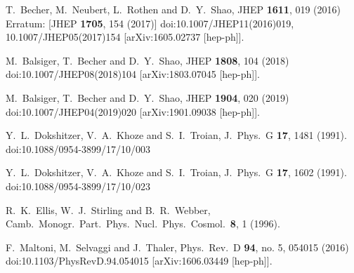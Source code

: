 \documentclass[11pt,a4paper]{article}
\begin{document}
\begin{thebibliography}{99}
  T.~Becher, M.~Neubert, L.~Rothen and D.~Y.~Shao,
  JHEP {\bf 1611}, 019 (2016)
  Erratum: [JHEP {\bf 1705}, 154 (2017)]
  doi:10.1007/JHEP11(2016)019, 10.1007/JHEP05(2017)154
  [arXiv:1605.02737 [hep-ph]].


  M.~Balsiger, T.~Becher and D.~Y.~Shao,
  JHEP {\bf 1808}, 104 (2018)
  doi:10.1007/JHEP08(2018)104
  [arXiv:1803.07045 [hep-ph]].


  M.~Balsiger, T.~Becher and D.~Y.~Shao,
  JHEP {\bf 1904}, 020 (2019)
  doi:10.1007/JHEP04(2019)020
  [arXiv:1901.09038 [hep-ph]].


  Y.~L.~Dokshitzer, V.~A.~Khoze and S.~I.~Troian,
  J.\ Phys.\ G {\bf 17}, 1481 (1991).
  doi:10.1088/0954-3899/17/10/003


  Y.~L.~Dokshitzer, V.~A.~Khoze and S.~I.~Troian,
  J.\ Phys.\ G {\bf 17}, 1602 (1991).
  doi:10.1088/0954-3899/17/10/023


  R.~K.~Ellis, W.~J.~Stirling and B.~R.~Webber,
  Camb.\ Monogr.\ Part.\ Phys.\ Nucl.\ Phys.\ Cosmol.\  {\bf 8}, 1 (1996).


  F.~Maltoni, M.~Selvaggi and J.~Thaler,
  Phys.\ Rev.\ D {\bf 94}, no. 5, 054015 (2016)
  doi:10.1103/PhysRevD.94.054015
  [arXiv:1606.03449 [hep-ph]].



\end{thebibliography}
\end{document}
